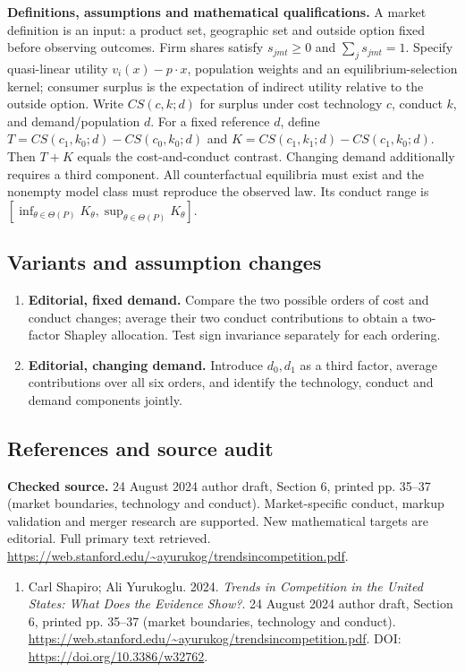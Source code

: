 \documentclass[11pt,a4paper]{article}
\begin{document}
\textbf{Definitions, assumptions and mathematical qualifications.} A market definition is an input: a product set, geographic set and outside option fixed before observing outcomes. Firm shares satisfy \(s_{jmt}\geq0\) and \(\sum_j s_{jmt}=1\). Specify quasi-linear utility \(v_i(x)-p\cdot x\), population weights and an equilibrium-selection kernel; consumer surplus is the expectation of indirect utility relative to the outside option. Write \(CS(c,k;d)\) for surplus under cost technology \(c\), conduct \(k\), and demand/population \(d\). For a fixed reference \(d\), define \(T=CS(c_1,k_0;d)-CS(c_0,k_0;d)\) and \(K=CS(c_1,k_1;d)-CS(c_1,k_0;d)\). Then \(T+K\) equals the cost-and-conduct contrast. Changing demand additionally requires a third component. All counterfactual equilibria must exist and the nonempty model class must reproduce the observed law. Its conduct range is \([\inf_{\theta\in\Theta(P)}K_\theta,\sup_{\theta\in\Theta(P)}K_\theta]\).
\subsection*{Variants and assumption changes}
\begin{enumerate}
\item \textbf{Editorial, fixed demand.} Compare the two possible orders of cost and conduct changes; average their two conduct contributions to obtain a two-factor Shapley allocation. Test sign invariance separately for each ordering.
\item \textbf{Editorial, changing demand.} Introduce \(d_0,d_1\) as a third factor, average contributions over all six orders, and identify the technology, conduct and demand components jointly.
\end{enumerate}
\subsection*{References and source audit}
\textbf{Checked source.} 24 August 2024 author draft, Section 6, printed pp. 35--37 (market boundaries, technology and conduct). Market-specific conduct, markup validation and merger research are supported. New mathematical targets are editorial. Full primary text retrieved. \url{https://web.stanford.edu/~ayurukog/trendsincompetition.pdf}.
\begin{enumerate}\raggedright
\item\hypertarget{definitions:source:30007672:1}{} Carl Shapiro; Ali Yurukoglu. 2024. \emph{Trends in Competition in the United States: What Does the Evidence Show?}. 24 August 2024 author draft, Section 6, printed pp. 35--37 (market boundaries, technology and conduct).
\url{https://web.stanford.edu/~ayurukog/trendsincompetition.pdf}.
DOI: \url{https://doi.org/10.3386/w32762}.
\end{enumerate}
\end{document}
